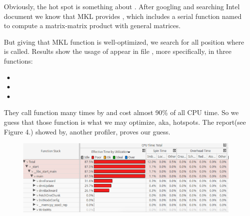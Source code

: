 \documentclass{article}
\begin{document}
Obviously, the hot spot is something about . After googling
and searching Intel document we know that MKL provides , which includes a serial function named 
to compute a matrix-matrix product with general matrices.%

But giving that MKL function is well-optimized, we search for all position where  is called. Results show the usage of  appear in file , more specifically, in three functions:%

\begin{itemize}[noitemsep,topsep=\mdcompacttopsep]%

\item{}%

\item{}%

\item{}%
\end{itemize}%

\noindent{}They call  function  many times by  and 
cost almost 90\% of all CPU time. So we guess that those function
 is what we may optimize, aka, hotspots.
The report(see Figure 4.) showed by, another profiler, proves our guess.%

\begin{figure}[tbp]%
\begin{mdcenter}%

\noindent{}\includegraphics[keepaspectratio=true,width=\dimmin{}{\dimwidth{0.90}}]{images/2016-02-19-10-36-25-}{}%

\mdhr{}%

\noindent{}%
\end{mdcenter}\label{fig-myfigure}%
\end{figure}%
\end{document}
